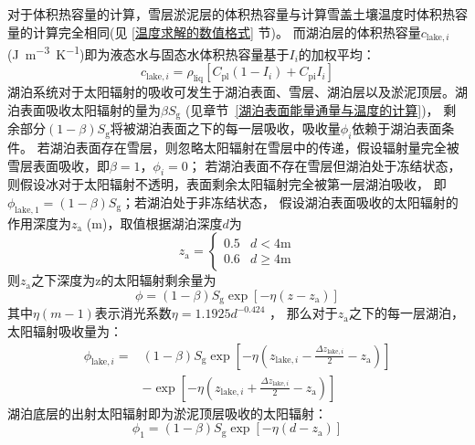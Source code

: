 对于体积热容量的计算，雪层淤泥层的体积热容量与计算雪盖土壤温度时体积热容量的计算完全相同(见 \ref{温度求解的数值格式} 节)。
而湖泊层的体积热容量$c_{\mathrm{lake},i}$ (\unit{J.m^{-3}.K^{-1}})即为液态水与固态水体积热容量基于$I_i$的加权平均：
\begin{equation}
  c_{\mathrm{lake},i}=\rho_{\mathrm{liq}}\left[C_{\mathrm{p l}}\left(1-I_{i}\right)+C_{\mathrm{p i}} I_{i}\right]
\end{equation}
湖泊系统对于太阳辐射的吸收可发生于湖泊表面、雪层、湖泊层以及淤泥顶层。湖泊表面吸收太阳辐射的量为$\beta S_{\mathrm {g}} $ (见章节~\ref{湖泊表面能量通量与温度的计算})，
剩余部分$\left(1-\beta\right)S_{\mathrm {g}}$将被湖泊表面之下的每一层吸收，吸收量$\phi_i$依赖于湖泊表面条件。
若湖泊表面存在雪层，则忽略太阳辐射在雪层中的传递，假设辐射量完全被雪层表面吸收，即$\beta=1$，$\phi_i=0$；
若湖泊表面不存在雪层但湖泊处于冻结状态，则假设冰对于太阳辐射不透明，表面剩余太阳辐射完全被第一层湖泊吸收，
即$\phi_{\mathrm{lake,1}}=\left(1-\beta\right)S_{\mathrm {g}} $；若湖泊处于非冻结状态，
假设湖泊表面吸收的太阳辐射的作用深度为$z_{\mathrm {a}} $ (m)，取值根据湖泊深度$d$为
\begin{equation}
  z_{\mathrm{a}}=\left\{\begin{array}{ll}0.5 & d<4 \text{m} \\ 0.6 & d \geqslant 4 \text{m}\end{array}\right.
\end{equation}
则$z_{\mathrm {a}} $之下深度为z的太阳辐射剩余量为
\begin{equation}
  \phi=(1-\beta) S_{\mathrm{g}} \exp \left[-\eta\left(z-z_{\mathrm{a}}\right)\right]
\end{equation}
其中$\eta(m-1)$表示消光系数$\eta=1.1925d^{-0.424}$ \citep{subin2012improved}，
那么对于$z_{\mathrm {a}} $之下的每一层湖泊，太阳辐射吸收量为：
\begin{equation}
  \begin{split}
    \phi_{\mathrm{lake},i}= & (1-\beta) S_{\mathrm{g}} \exp \left[-\eta\left(z_{\mathrm{lake},i}-\frac{\Delta z_{\mathrm{lake},i}}{2}-z_{\mathrm{a}}\right)\right] \\
    & -\exp \left[-\eta\left(z_{\mathrm{lake},i}+\frac{\Delta z_{\mathrm{lake},i}}{2}-z_{\mathrm{a}}\right)\right]
  \end{split}
\end{equation}
湖泊底层的出射太阳辐射即为淤泥顶层吸收的太阳辐射：
\begin{equation}
  \phi_{1}=(1-\beta) S_{\mathrm{g}} \exp \left[-\eta\left(d-z_{\mathrm{a}}\right)\right]
\end{equation}
